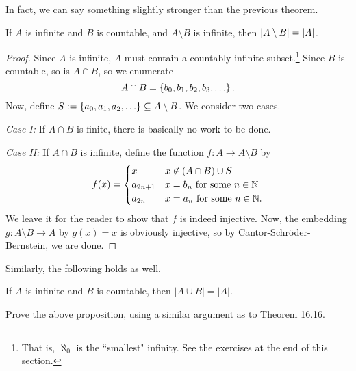 \documentclass{article}
\begin{document}
In fact, we can say something slightly stronger than the previous theorem.
\begin{theorem}
If $A$ is infinite and $B$ is countable, and $A\setminus B$ is infinite, then $\left|A\setminus B\right| = \left|A\right|$.
\end{theorem}
\begin{proof}
Since $A$ is infinite, $A$ must contain a countably infinite subset.\footnote{That is, $\aleph_0$ is the ``smallest" infinity. See the exercises at the end of this section.} Since $B$ is countable, so is $A\cap B$, so we enumerate
$$A\cap B = \left\{b_0, b_1, b_2, b_3, \ldots\right\}.$$
Now, define $S := \left\{a_0, a_1, a_2, \ldots\right\} \subseteq A\setminus B$. We consider two cases.

\textit{Case I:} If $A\cap B$ is finite, there is basically no work to be done.

\textit{Case II:} If $A\cap B$ is infinite, define the function $f: A\to A\setminus B$ by
$$f(x) = \begin{cases}
    x & x\not\in (A\cap B) \cup S \\
    a_{2n+1} & x = b_n \text{ for some } n\in\mathbb N \\
    a_{2n} & x = a_n \text{ for some } n \in \mathbb N.\\
\end{cases}$$
We leave it for the reader to show that $f$ is indeed injective. Now, the embedding $g: A\setminus B\to A$ by $g(x) = x$ is obviously injective, so by Cantor-Schr\"oder-Bernstein, we are done.
\end{proof}

Similarly, the following holds as well.
\begin{proposition}
If $A$ is infinite and $B$ is countable, then $|A\cup B| = |A|$.
\end{proposition}
\begin{exercise}
Prove the above proposition, using a similar argument as to Theorem 16.16.
\end{exercise}
\end{document}
